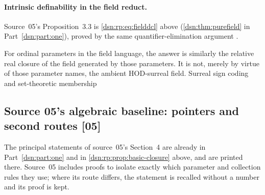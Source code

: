 \documentclass[11pt,a4paper]{article}
\numberwithin{equation}{section}
\theoremstyle{definition}
\theoremstyle{remark}
\newcommand{\HOD}{\mathrm{HOD}}
\newcommand{\src}[1]{\textup{\textsf{\small[#1]}}}
\begin{document}
\paragraph{Intrinsic definability in the field reduct.}
Source~05's Proposition~3.3 is \eqref{dsn:rp:eq:fielddcl} above
(\cref{dsn:thm:purefield} in Part~\ref{dsn:part:one}), proved by the same
quantifier-elimination argument \cite{vddTame}.

For ordinal parameters in the field language, the answer is similarly
the relative real closure of the field generated by those parameters.
It is not, merely by virtue of those parameter names, the ambient
$\HOD$-surreal field. Surreal sign coding and set-theoretic membership

\subsection{Source 05's algebraic baseline: pointers and second routes \src{05}}
\label{dsn:ca:sec:algebra}

The principal statements of source~05's Section~4 are already in
Part~\ref{dsn:part:one} and in \cref{dsn:rp:prop:basic-closure} above, and are
printed there. Source~05 includes proofs to isolate exactly which parameter
and collection rules they use; where its route differs, the statement is
recalled without a number and its proof is kept.
\end{document}

